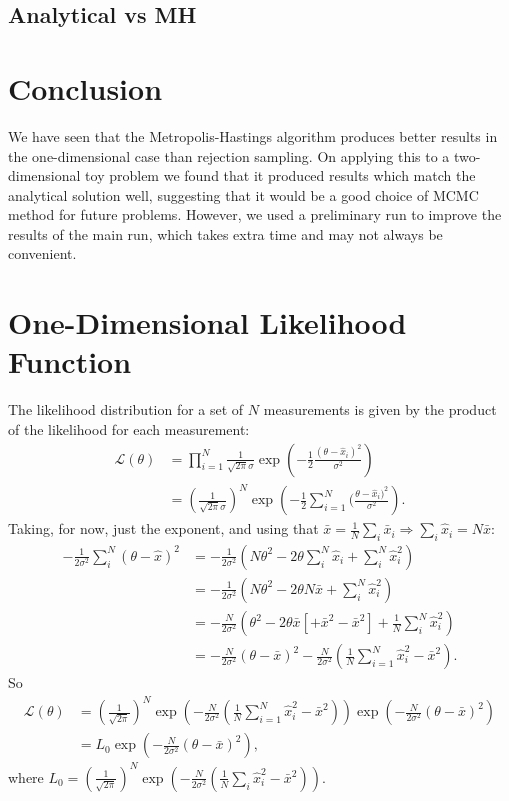 \documentclass[a4paper,11pt,twoside]{article}
\begin{document}
\subsection{Analytical vs MH}

\section{Conclusion}
We have seen that the Metropolis-Hastings algorithm produces better results in
the one-dimensional case than rejection sampling. On applying this to a
two-dimensional toy problem we found that it produced results which match the
analytical solution well, suggesting that it would be a good choice of MCMC
method for future problems. However, we used a preliminary run to improve the
results of the main run, which takes extra time and may not always be convenient.


\appendix 
\label{appendix}

\section{One-Dimensional Likelihood Function}
\label{sec:likelihood}
The likelihood distribution for a set of $N$ measurements is given by the product of the likelihood for each measurement:
\begin{align*}
	\mathcal{L}(\theta) &= \prod_{i=1}^{N} \frac{1}{\sqrt{2\pi}\sigma}\exp\left(-\frac{1}{2}\frac{(\theta - \hat{x}_i)^2}{\sigma^2}\right)
	\\ &= \left(\frac{1}{\sqrt{2\pi}\sigma}\right)^N \exp\left(-\frac{1}{2}\sum_{i=1}^{N}(\frac{\theta - \hat{x}_i)^2}{\sigma^2}\right).
\end{align*}
Taking, for now, just the exponent, and using that $\bar{x} = \frac{1}{N} \sum_i \bar{x}_i \Rightarrow \sum_i \hat{x}_i = N \bar{x}$:
\begin{align*}
	-\frac{1}{2\sigma^2}\sum_i^N(\theta - \hat{x})^2 &= -\frac{1}{2\sigma^2}(N\theta^2 - 2\theta \sum_i^N\hat{x}_i + \sum_i^N \hat{x}_i^2) 
	\\ &= -\frac{1}{2\sigma^2}(N\theta^2 - 2\theta N \bar{x} + \sum_i^N \hat{x}_i^2) 
	\\ &= -\frac{N}{2\sigma^2} (\theta^2 - 2\theta \bar{x} [ + \bar{x}^2 - \bar{x}^2]  + \frac{1}{N} \sum_i^N \hat{x}_i^2) 
	\\ &= -\frac{N}{2 \sigma^2} (\theta - \bar{x})^2 - \frac{N}{2 \sigma^2}(\frac{1}{N} \sum_{i=1}^{N} \hat{x}_i^2 - \bar{x}^2).
\end{align*}
So
\begin{align*}
	\mathcal{L}(\theta) &= \left( \frac{1}{\sqrt{2\pi}} \right)^N \exp \left(- \frac{N}{2 \sigma^2}(\frac{1}{N} \sum_{i=1}^{N} \hat{x}_i^2 - \bar{x}^2)\right) \exp \left(-\frac{N}{2 \sigma^2} (\theta - \bar{x})^2 \right)
	\\ &= L_0 \exp \left( -\frac{N}{2 \sigma^2} (\theta - \bar{x})^2 \right),
\end{align*}
where $L_0 = \left( \frac{1}{\sqrt{2\pi}} \right)^N \exp \left(- \frac{N}{2 \sigma^2}(\frac{1}{N} \sum_i \hat{x}_i^2 - \bar{x}^2)\right)$.
\end{document}
